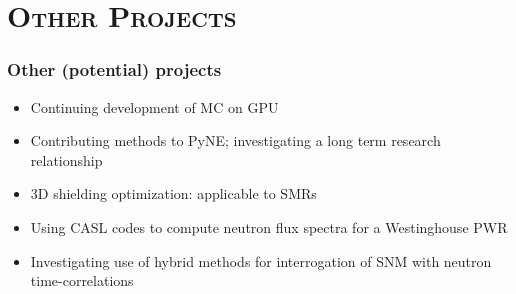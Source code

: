 \documentclass[xcolor=x11names,compress]{beamer}
\renewcommand{\(}{\begin{columns}}
\renewcommand{\)}{\end{columns}}
\newcommand{\<}[1]{\begin{column}{#1}}
\renewcommand{\>}{\end{column}}
\begin{document}
\section{\scshape Other Projects}
\begin{frame}[fragile]
  \frametitle{Other (potential) projects}

  	\begin{itemize}
  	\item Continuing development of MC on GPU
  	\item Contributing methods to PyNE; investigating a long term research relationship 
	\item 3D shielding optimization: applicable to SMRs 
	\item Using CASL codes to compute neutron flux spectra for a Westinghouse PWR 
	\item Investigating use of hybrid methods for interrogation of SNM with neutron time-correlations 
	\end{itemize}
	
\end{frame}
\end{document}
